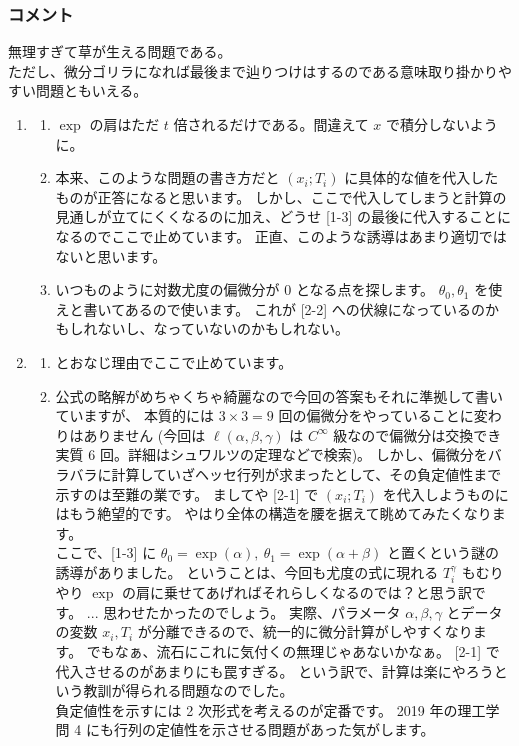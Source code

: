 \documentclass[./main.tex]{subfiles}
\begin{document}
    \subsubsection*{コメント}
    無理すぎて草が生える問題である。\\
    ただし、微分ゴリラになれば最後まで辿りつけはするのである意味取り掛かりやすい問題ともいえる。
    \begin{enumerate}
        \item 
        \begin{enumerate}
            \item $\exp$ の肩はただ $t$ 倍されるだけである。間違えて $x$ で積分しないように。

            \item 本来、このような問題の書き方だと $(x_i; T_i)$ に具体的な値を代入したものが正答になると思います。
            しかし、ここで代入してしまうと計算の見通しが立てにくくなるのに加え、どうせ [1-3] の最後に代入することになるのでここで止めています。
            正直、このような誘導はあまり適切ではないと思います。

            \item いつものように対数尤度の偏微分が $0$ となる点を探します。
            $\theta_0, \theta_1$ を使えと書いてあるので使います。
            これが [2-2] への伏線になっているのかもしれないし、なっていないのかもしれない。
        \end{enumerate}

        \item
        \begin{enumerate}
            \item \relax [1-2] とおなじ理由でここで止めています。
            \item 公式の略解がめちゃくちゃ綺麗なので今回の答案もそれに準拠して書いていますが、
            本質的には $3\times3 = 9$ 回の偏微分をやっていることに変わりはありません
            (今回は $\ell (\alpha, \beta, \gamma)$ は $C^\infty$ 級なので偏微分は交換でき実質 6 回。詳細はシュワルツの定理などで検索)。
            しかし、偏微分をバラバラに計算していざヘッセ行列が求まったとして、その負定値性まで示すのは至難の業です。
            ましてや [2-1] で $(x_i; T_i)$ を代入しようものにはもう絶望的です。
            やはり全体の構造を腰を据えて眺めてみたくなります。\\
            ここで、[1-3] に $\theta_0 = \exp(\alpha), \ \theta_1 = \exp (\alpha + \beta)$ と置くという謎の誘導がありました。
            ということは、今回も尤度の式に現れる $T_i^\gamma$ もむりやり $\exp$ の肩に乗せてあげればそれらしくなるのでは？と思う訳です。
            ... 思わせたかったのでしょう。
            実際、パラメータ $\alpha, \beta, \gamma$ とデータの変数 $x_i, T_i$ が分離できるので、統一的に微分計算がしやすくなります。
            でもなぁ、流石にこれに気付くの無理じゃあないかなぁ。
            [2-1] で代入させるのがあまりにも罠すぎる。
            という訳で、計算は楽にやろうという教訓が得られる問題なのでした。\\
            負定値性を示すには 2 次形式を考えるのが定番です。
            2019 年の理工学 問 4 にも行列の定値性を示させる問題があった気がします。


\end{enumerate}
\end{enumerate}
\end{document}
